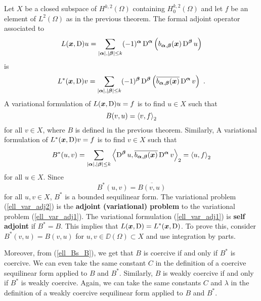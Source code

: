 Let $X$ be a closed subspace of $\displaystyle H^{k,2}(\Omega)$ containing
$\displaystyle H^{k,2}_0(\Omega)$ and let $f$ be an element of
$\displaystyle L^2(\Omega)$ as in
the previous theorem.  The formal adjoint operator associated to
\[
L({\bm{x}},\operatorname{D})u = \sum_{|{\bm{\alpha}}|,|{\bm{\beta}}|\leq k}
(-1)^{{\bm{\alpha}}} \operatorname{D}^{{\bm{\alpha}}}
\left( b_{{\bm{\alpha}},{\bm{\beta}}}({\bm{x}}) \operatorname{D}^{{\bm{\beta}}} u\right)
\]
is
\[
L^\ast({\bm{x}},\operatorname{D})v = \sum_{|{\bm{\alpha}}|,|{\bm{\beta}}|\leq k}
(-1)^{{\bm{\beta}}} \operatorname{D}^{{\bm{\beta}}}
\left( \overline{b_{{\bm{\alpha}},{\bm{\beta}}}({\bm{x}})}
\operatorname{D}^{{\bm{\alpha}}} v\right) \  .
\]
A variational formulation of $L({\bm{x}},\operatorname{D})u = f$ is to find
$u\in X$ such that
\begin{equation} \label{ell_var_adj1}
B(v,u) = \left\langle{v} , {f}\right\rangle_2
\end{equation}
for all $v \in X$, where $B$ is defined in the previous theorem.  Similarly, A
variational formulation of $L^\ast({\bm{x}},\operatorname{D})v = f$ is to find
$v\in X$ such that
\begin{equation} \label{ell_var_adj2}
B^\ast(u,v) = \sum_{|{\bm{\alpha}}|,|{\bm{\beta}}|\leq k} 
\left\langle{\operatorname{D}^{{\bm{\beta}}} u} , {\overline{b_{{\bm{\alpha}},{\bm{\beta}}}({\bm{x}})}
\operatorname{D}^{{\bm{\alpha}}} v}\right\rangle_2 = \left\langle{u} , {f}\right\rangle_2
\end{equation}
for all $u \in X$.  Since
\begin{equation} \label{ell_Bs_B}
B^\ast(u,v) = \overline{B(v,u)}
\end{equation}
for all $u,v \in X$,
$\displaystyle B^\ast$ is a bounded sequilinear form. The variational problem
(\ref{ell_var_adj2}) is the {\bfseries adjoint (variational) problem}
to the variational problem (\ref{ell_var_adj1}).  The variational
formulation (\ref{ell_var_adj1}) is {\bfseries self adjoint}
 if
$\displaystyle B^\ast=B$.  This implies that
$\displaystyle L({\bm{x}},\operatorname{D})=L^\ast({\bm{x}},\operatorname{D})$.  To
prove this, consider $\displaystyle B^\ast(v,u) = B(v,u)$ for
$u,v \in \DD(\Omega) \subset X$ and use integration by parts.

Moreover, from (\ref{ell_Bs_B}), we get that $B$ is coercive
if and only if $\displaystyle B^\ast$ is coercive.  We can even take the same
constant $C$ in the definition of a coercive sequilinear form applied
to $B$ and $\displaystyle B^\ast$.  Similarly, $B$ is weakly coercive
if and only if $\displaystyle B^\ast$ is weakly coercive.  Again, we
can take the same constants $C$ and $\lambda$ in the definition of a
weakly coercive sequilinear form applied to $B$ and $\displaystyle B^\ast$.

